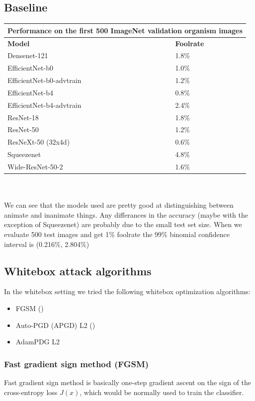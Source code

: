 \subsection{Baseline}
\begin{tabular}{ ||p{5cm}|p{3cm}|| }
  \hline
     \multicolumn{2}{|c|}{Performance on the first 500 ImageNet validation organism images} \\
 \hline
 \textbf{Model} & \textbf{Foolrate} \\
 \hline
 \hline
 Densenet-121 & 1.8\%  \\
 \hline
 EfficientNet-b0 & 1.0\% \\
 \hline
 EfficientNet-b0-advtrain & 1.2\% \\
 \hline
 EfficientNet-b4 & 0.8\% \\
 \hline
 EfficientNet-b4-advtrain & 2.4\% \\
 \hline
 ResNet-18 & 1.8\% \\
 \hline
 ResNet-50 & 1.2\% \\
 \hline
 ResNeXt-50 (32x4d) & 0.6\% \\
 \hline
 Squeezenet & 4.8\% \\
 \hline
 Wide-ResNet-50-2 & 1.6\% \\
 \hline
\end{tabular} \\ \\

We can see that the models used are pretty good at distinguishing between animate and inanimate things. Any differances in the accuracy (maybe with the exception of Squeezenet) are probably due to the small test set size. When we evaluate 500 test images and get 1\% foolrate the 99\% binomial confidence interval is (0.216\%, 2.804\%)

\subsection{Whitebox attack algorithms}
In the whitebox setting we tried the following whitebox optimization algorithms:

\begin{itemize}
    \item FGSM (\cite{goodfellow2015explaining})
    \item Auto-PGD (APGD) L2 (\cite{croce2020reliable})
    \item AdamPDG L2
\end{itemize}


\subsubsection{Fast gradient sign method (FGSM)}
\label{fgsm_exp}
Fast gradient sign method is basically one-step gradient ascent on the sign of the cross-entropy loss $J(x)$, which would be normally used to train the classifier.

